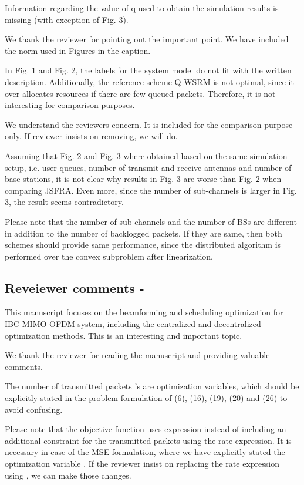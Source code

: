  Information regarding the value of q used to obtain the simulation results is missing (with exception of Fig. 3).

\resp We thank the reviewer for pointing out the important point. We have included the norm used in Figures in the caption.

 In Fig. 1 and Fig. 2, the labels for the system model do not fit with the written description. Additionally, the reference scheme Q-WSRM is not optimal, since it over allocates resources if there are few queued packets. Therefore, it is not interesting for comparison purposes.

\resp We understand the reviewers concern. It is included for the comparison purpose only. If reviewer insists on removing, we will do.

 Assuming that Fig. 2 and Fig. 3 where obtained based on the same simulation setup, i.e. user queues, number of transmit and receive antennas and number of base stations, it is not clear why results in Fig. 3 are worse than Fig. 2 when comparing JSFRA. Even more, since the number of sub-channels is larger in Fig. 3, the result seems contradictory.

\resp Please note that the number of sub-channels and the number of \acp{BS} are different in addition to the number of backlogged packets. If they are same, then both schemes should provide same performance, since the distributed algorithm is performed over the convex subproblem after linearization.

\subsection*{Reveiewer comments - }

 This manuscript focuses on the beamforming and scheduling optimization for IBC MIMO-OFDM system, including the centralized and decentralized optimization methods. This is an interesting and important topic.

\resp We thank the reviewer for reading the manuscript and providing valuable comments.

 The number of transmitted packets 's are optimization variables, which should be explicitly stated in the problem formulation of (6), (16), (19), (20) and (26) to avoid confusing.

\resp Please note that the objective function uses  expression instead of including an additional constraint for the transmitted packets using the rate expression. It is necessary in case of the MSE formulation, where we have explicitly stated the optimization variable . If the reviewer insist on replacing the rate expression using , we can make those changes.

